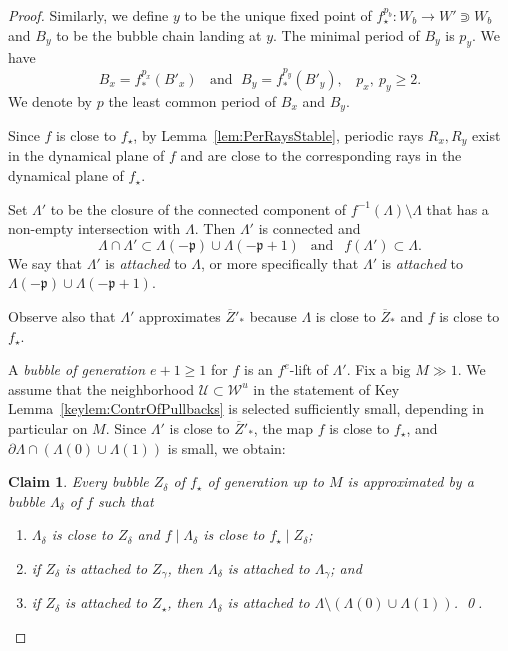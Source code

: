\documentclass[]{amsart}
\renewcommand{\sp}{{\ \ }}
\newcommand{\bLambda}{{\mathbb{\Lambda}}}
\newcommand{\str}{{\star}}
\newcommand{\pp}{\mathfrak{p}}
\newcommand\WW{\mathcal{W}}
\newcommand\UU{\mathcal{U}}
\newtheorem{claim}{Claim}
\theoremstyle{remark}
\numberwithin{equation}{section}
\theoremstyle{definition}
\begin{document}
\begin{proof}
 Similarly, we define $y$ to be the unique fixed point of $f_\str^{p_b}\colon W_b\to W'\Supset W_b$ and $B_y$ to be the bubble chain landing at $y$. The minimal period of $B_y$ is $p_y$. We have 
 \begin{equation}
\label{eq:B'_x}
B_x=f^{p_x}_* (B'_x)\;  \;\text{ and }\; B_y=f^{p_y}_*(B'_y),\sp\sp p_x,\ p_y\ge 2.
\end{equation}
We denote by $p$ the least common period of $B_x$ and $B_y$.



 

Since $f$ is close to $f_\str$, by Lemma~\ref{lem:PerRaysStable}, periodic rays $ R_x,R_y$ exist in the dynamical plane of $f$ and are close to the corresponding rays in the dynamical plane of $f_\str$.





Set $\bLambda'$ to be the closure of the connected component of $f^{-1}(\bLambda)\setminus \bLambda$ that has a non-empty intersection with $\bLambda$. Then $\bLambda'$ is connected and 
\begin{equation}
\label{eq:f of Lambda'}\bLambda\cap \bLambda'\subset \Lambda(-\pp)\cup  \Lambda(-\pp+1)\sp \text{ and }\sp f(\bLambda')\subset \bLambda.
\end{equation}
We say that $\bLambda'$ is \emph{attached} to $\bLambda$, or more specifically that $\bLambda'$ is \emph{attached} to $\Lambda(-\pp)\cup \Lambda(-\pp+1)$.



 Observe also that $\bLambda'$ approximates $\overline Z'_*$ because $\bLambda$ is close to $\overline Z_*$ and $f$ is close to $f_\str$. 

A \emph{bubble of generation $e+1\ge 1$} for $f$ is an $f^e$-lift of $\bLambda'$. Fix a big $M\gg 1$. We assume that the neighborhood $\UU\subset \WW^u$ in the statement of Key Lemma~\ref{keylem:ContrOfPullbacks} is selected sufficiently small, depending in particular on $M$. Since $\bLambda'$ is close to $\overline Z'_*$, the map $f$ is close to $f_\str$, and $\partial\bLambda \cap (\Lambda(0)\cup \Lambda(1))$ is small, we obtain:
\begin{claim}
\label{cl:ContOfBubbles}
Every bubble $Z_\delta$ of $f_\str$ of generation up to $M$ is approximated by a bubble $\bLambda_\delta$ of $f$ such that 
\begin{enumerate}
\item $\bLambda_\delta$ is close to $Z_\delta$ and $f\mid \bLambda_\delta$ is close to $f_\str \mid Z_\delta$;
\item if $Z_\delta$ is attached to $Z_{\gamma}$, then $\bLambda_\delta$ is attached to $\bLambda_\gamma$; and 
\item if $Z_\delta$ is attached to $Z_\str$, then  $\bLambda_\delta$ is attached to $\bLambda\setminus (\Lambda(0)\cup \Lambda(1))$. \qed.\label{cl:ContOfBubbles:part:3}
\end{enumerate}
\end{claim}



\end{proof}
\end{document}
